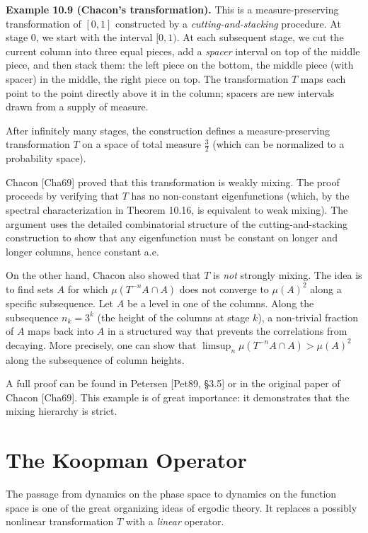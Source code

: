 \textbf{Example 10.9 (Chacon's transformation).} This is a measure-preserving transformation of $[0,1]$ constructed by a \textit{cutting-and-stacking} procedure. At stage 0, we start with the interval $[0,1)$. At each subsequent stage, we cut the current column into three equal pieces, add a \textit{spacer} interval on top of the middle piece, and then stack them: the left piece on the bottom, the middle piece (with spacer) in the middle, the right piece on top. The transformation $T$ maps each point to the point directly above it in the column; spacers are new intervals drawn from a supply of measure.

After infinitely many stages, the construction defines a measure-preserving transformation $T$ on a space of total measure $\frac{3}{2}$ (which can be normalized to a probability space).

Chacon [Cha69] proved that this transformation is weakly mixing. The proof proceeds by verifying that $T$ has no non-constant eigenfunctions (which, by the spectral characterization in Theorem 10.16, is equivalent to weak mixing). The argument uses the detailed combinatorial structure of the cutting-and-stacking construction to show that any eigenfunction must be constant on longer and longer columns, hence constant a.e.

On the other hand, Chacon also showed that $T$ is \textit{not} strongly mixing. The idea is to find sets $A$ for which $\mu(T^{-n}A \cap A)$ does not converge to $\mu(A)^2$ along a specific subsequence. Let $A$ be a level in one of the columns. Along the subsequence $n_k = 3^k$ (the height of the columns at stage $k$), a non-trivial fraction of $A$ maps back into $A$ in a structured way that prevents the correlations from decaying. More precisely, one can show that $\limsup_{n} \mu(T^{-n}A \cap A) > \mu(A)^2$ along the subsequence of column heights.

A full proof can be found in Petersen [Pet89, §3.5] or in the original paper of Chacon [Cha69]. This example is of great importance: it demonstrates that the mixing hierarchy is strict.



\section{The Koopman Operator}\label{sec:10.4}

The passage from dynamics on the phase space to dynamics on the function space is one of the great organizing ideas of ergodic theory. It replaces a possibly nonlinear transformation $T$ with a \textit{linear} operator.

